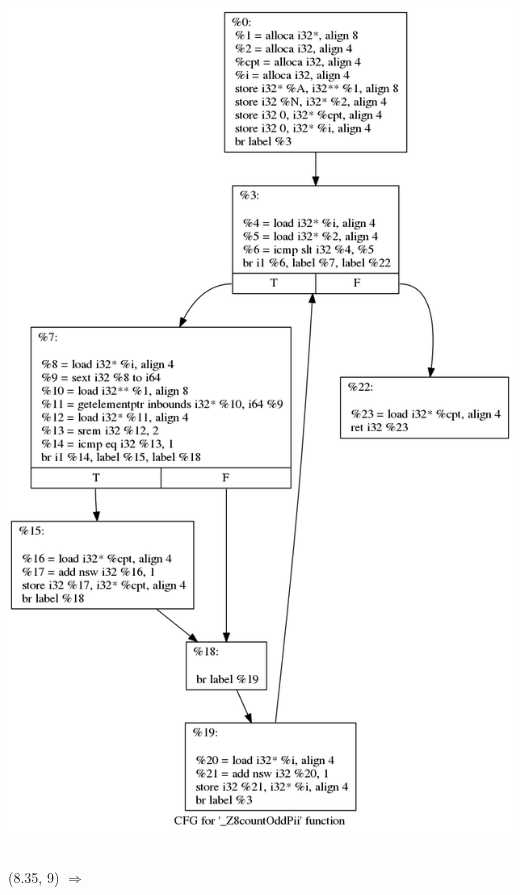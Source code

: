 \documentclass{beamer}
\begin{document}
\begin{frame}
\begin{columns}
\begin{column}{0.5\textwidth}
\begin{center}
\colorbox{white}{\includegraphics[scale=0.13]{cfg.png}}
\end{center}
    \end{column}
\end{columns}
\begin{textblock}{6}(8.35, 9)
	\Huge{$\Rightarrow$}
\end{textblock}
\end{frame}
\end{document}
